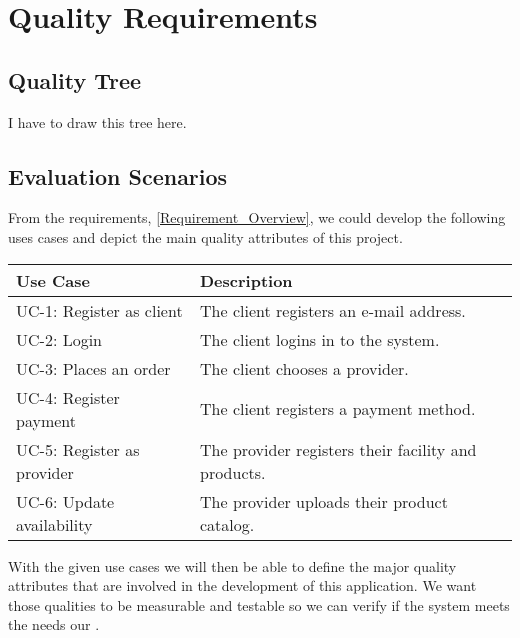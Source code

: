 \section{Quality Requirements}

\subsection{Quality Tree}

I have to draw this tree here.

\subsection{Evaluation Scenarios} 
From the requirements, \ref{Requirement_Overview}, we could develop the following uses cases and depict the main quality 
attributes of this project. 

\begin{table}[H]
    \begin{tabularx}{\textwidth}{lX}
    \toprule
    Use Case & Description  \\
    \midrule
    UC-1: Register as \gls{client} & The \gls{client} registers an e-mail address.\\
    UC-2: Login & The \gls{client} logins in to the system. \\
    UC-3: Places an order & The \gls{client} chooses a \gls{provider}. \\
    UC-4: Register payment & The \gls{client} registers a payment method. \\
    UC-5: Register as \gls{provider} & The \gls{provider} registers their facility and products. \\
    UC-6: Update availability & The \gls{provider} uploads their product catalog. \\
    \bottomrule
    \end{tabularx}
\end{table}


With the given use cases we will then be able to define the major quality attributes that are involved in the 
development of this application. We want those qualities to be measurable and testable so we can verify if the 
system meets the needs our  \cite{refbook:DSHC}.

